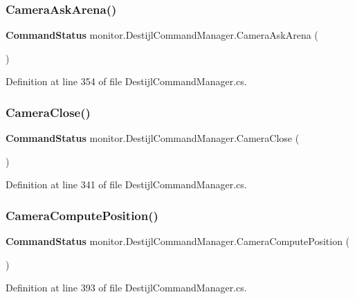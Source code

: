 \subsubsection{Camera\+Ask\+Arena()}
{\footnotesize\ttfamily \textbf{ Command\+Status} monitor.\+Destijl\+Command\+Manager.\+Camera\+Ask\+Arena (\begin{DoxyParamCaption}{ }\end{DoxyParamCaption})}



Definition at line 354 of file Destijl\+Command\+Manager.\+cs.

\mbox{\label{classmonitor_1_1_destijl_command_manager_a94b085d9de512cd7e80bcefd516d460c}} 
\subsubsection{Camera\+Close()}
{\footnotesize\ttfamily \textbf{ Command\+Status} monitor.\+Destijl\+Command\+Manager.\+Camera\+Close (\begin{DoxyParamCaption}{ }\end{DoxyParamCaption})}



Definition at line 341 of file Destijl\+Command\+Manager.\+cs.

\mbox{\label{classmonitor_1_1_destijl_command_manager_ad04df7759d2698334a410fe32b78e21e}} 
\subsubsection{Camera\+Compute\+Position()}
{\footnotesize\ttfamily \textbf{ Command\+Status} monitor.\+Destijl\+Command\+Manager.\+Camera\+Compute\+Position (\begin{DoxyParamCaption}{ }\end{DoxyParamCaption})}



Definition at line 393 of file Destijl\+Command\+Manager.\+cs.

\mbox{\label{classmonitor_1_1_destijl_command_manager_a292d7e2961ff31a80d9abf79b7b41126}} 
